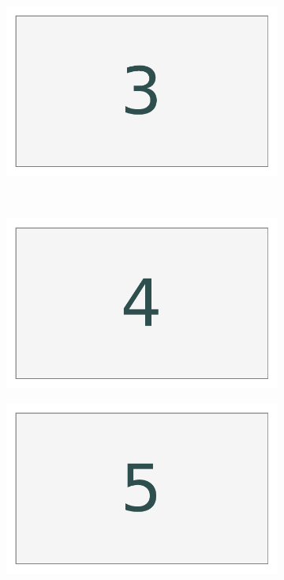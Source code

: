 \begin{figure}[H]
\begin{framed}
\begin{subfigure}{.32\textwidth}
\end{subfigure}
%
\begin{subfigure}{.32\textwidth}
    \centering
    \includegraphics[width=\linewidth]{figures/layout_3.pdf}
\end{subfigure}
\\
\begin{subfigure}{.32\textwidth}
    \centering
    \includegraphics[width=\linewidth]{figures/layout_4.pdf}
\end{subfigure}
%
\begin{subfigure}{.32\textwidth}
    \centering
    \includegraphics[width=\linewidth]{figures/layout_5.pdf}

\end{subfigure}
\end{framed}
\end{figure}

